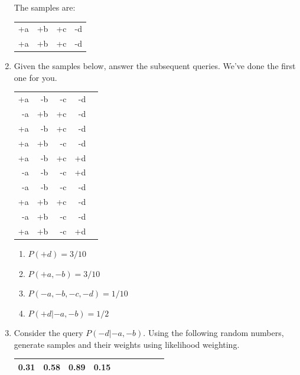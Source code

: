 \documentclass[12pt]{article}
\begin{document}
\begin{enumerate}
The samples are:

\begin{flushleft}
\begin{tabular}{llll}
+a & +b & +c & -d \\
+a & +b & +c & -d \\
\end{tabular}
\end{flushleft}

\item Given the samples below, answer the subsequent queries. We've done the first one for you.

\begin{flushleft}
\begin{tabular}{rrrrr} 
+a & -b & -c & -d  \\
-a & +b & +c & -d  \\
+a & -b & +c & -d  \\
+a & +b & -c & -d  \\
+a & -b & +c & +d  \\
-a & -b & -c & +d  \\
-a & -b & -c & -d  \\
+a & +b & +c & -d  \\
-a & +b & -c & -d  \\
+a & +b & -c & +d  \\
\end{tabular}
\end{flushleft}

\begin{enumerate}

  \item $P(+d) = 3/10$

  \item $P(+a,-b) = 3/10$

  \item $P(-a,-b,-c,-d) = 1/10$

  \item $P(+d | -a, -b) = 1/2$

\end{enumerate}

\item Consider the query $P(-d|-a,-b)$.  Using the following random numbers, generate samples and their weights using likelihood
  weighting.

\begin{center}
\begin{tabular}{|c|c|c|c|c|c|c|c|c|c|} \hline
0.31 & 0.58 & 0.89 & 0.15  \\ \hline
\end{tabular}
\end{center}


\end{enumerate}
\end{document}
